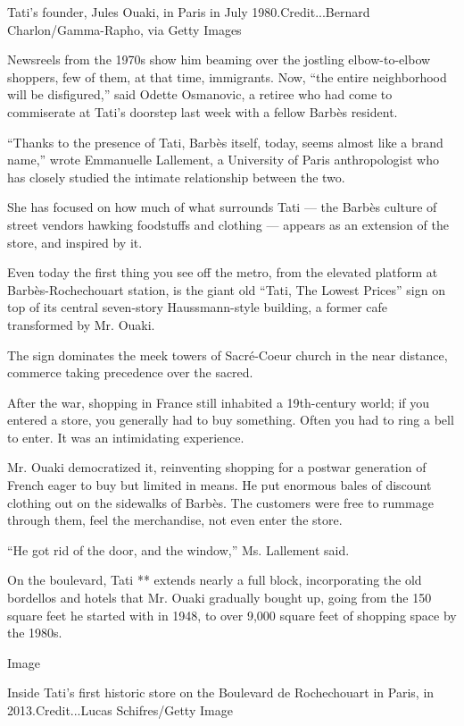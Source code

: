 Tati's founder, Jules Ouaki, in Paris in July 1980.Credit...Bernard
Charlon/Gamma-Rapho, via Getty Images

Newsreels from the 1970s show him beaming over the jostling
elbow-to-elbow shoppers, few of them, at that time, immigrants. Now,
``the entire neighborhood will be disfigured,'' said Odette Osmanovic, a
retiree who had come to commiserate at Tati's doorstep last week with a
fellow Barbès resident.

``Thanks to the presence of Tati, Barbès itself, today, seems almost
like a brand name,'' wrote Emmanuelle Lallement, a University of Paris
anthropologist who has closely studied the intimate relationship between
the two.

She has focused on how much of what surrounds Tati --- the Barbès
culture of street vendors hawking foodstuffs and clothing --- appears as
an extension of the store, and inspired by it.

Even today the first thing you see off the metro, from the elevated
platform at Barbès-Rochechouart station, is the giant old ``Tati, The
Lowest Prices'' sign on top of its central seven-story Haussmann-style
building, a former cafe transformed by Mr. Ouaki.

The sign dominates the meek towers of Sacré-Coeur church in the near
distance, commerce taking precedence over the sacred.

After the war, shopping in France still inhabited a 19th-century world;
if you entered a store, you generally had to buy something. Often you
had to ring a bell to enter. It was an intimidating experience.

Mr. Ouaki democratized it, reinventing shopping for a postwar generation
of French eager to buy but limited in means. He put enormous bales of
discount clothing out on the sidewalks of Barbès. The customers were
free to rummage through them, feel the merchandise, not even enter the
store.

``He got rid of the door, and the window,'' Ms. Lallement said.

On the boulevard, Tati ** extends nearly a full block, incorporating the
old bordellos and hotels that Mr. Ouaki gradually bought up, going from
the 150 square feet he started with in 1948, to over 9,000 square feet
of shopping space by the 1980s.

Image

Inside Tati's first historic store on the Boulevard de Rochechouart in
Paris, in 2013.Credit...Lucas Schifres/Getty Image

